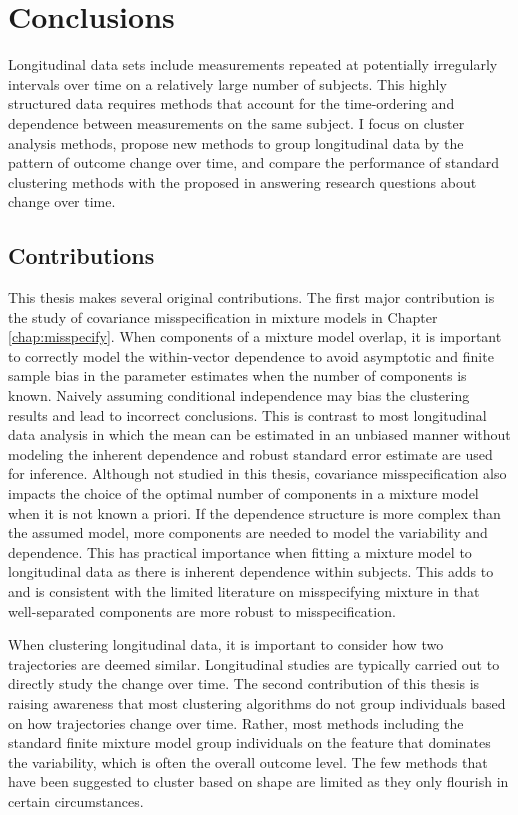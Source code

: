 \chapter{Conclusions}
\label{chap:concl}
Longitudinal data sets include measurements repeated at potentially irregularly intervals over time on a relatively large number of subjects. This highly structured data requires methods that account for the time-ordering and dependence between measurements on the same subject. I focus on cluster analysis methods, propose new methods to group longitudinal data by the pattern of outcome change over time, and compare the performance of standard clustering methods with the proposed in answering research questions about change over time. 

\section{Contributions}
This thesis makes several original contributions. The first major contribution is the study of covariance misspecification in mixture models in Chapter \ref{chap:misspecify}. When components of a mixture model overlap, it is important to correctly model the within-vector dependence to avoid asymptotic and finite sample bias in the parameter estimates when the number of components is known. Naively assuming conditional independence may bias the clustering results and lead to incorrect conclusions. This is contrast to most longitudinal data analysis in which the mean can be estimated in an unbiased manner without modeling the inherent dependence and robust standard error estimate are used for inference. Although not studied in this thesis, covariance misspecification also impacts the choice of the optimal number of components in a mixture model when it is not known a priori. If the dependence structure is more complex than the assumed model, more components are needed to model the variability and dependence. This has practical importance when fitting a mixture model to longitudinal data as there is inherent dependence within subjects. This adds to and is consistent with the limited literature on misspecifying mixture in that well-separated components are more robust to misspecification. 

When clustering longitudinal data, it is important to consider how two trajectories are deemed similar. Longitudinal studies are typically carried out to directly study the change over time. The second contribution of this thesis is raising awareness that most clustering algorithms do not group individuals based on how trajectories change over time.  Rather, most methods including the standard finite mixture model group individuals on the feature that dominates the variability, which is often the overall outcome level. The few methods that have been suggested to cluster based on shape are limited as they only flourish in certain circumstances.


